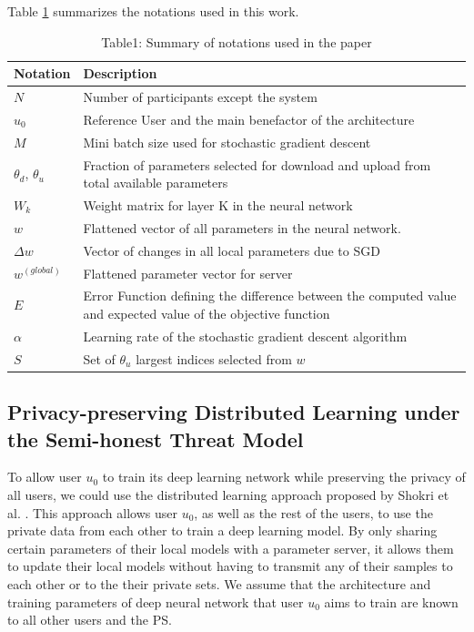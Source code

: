 \documentclass[conference]{IEEEtran}
\begin{document}
Table \ref{table:1} summarizes the notations used in this work.
\begin{table}[!h]
\centering
\caption{Table1: Summary of notations used in the paper}
\label{table:1}
\begin{tabular}{ | m{} | m{}| } 
\hline
\textbf{Notation} & \textbf{Description} \\
 \hline\hline

$N$ & Number of participants except the system\\
\hline
$u_0$ & Reference User and the  main benefactor of the architecture \\
\hline
$M$ & Mini batch size used for stochastic gradient descent\\
\hline
$\theta_d$, $\theta_u$ & Fraction of parameters selected for download and upload from total available parameters \\
\hline
$W_k$ & Weight matrix for layer K in the neural network\\
\hline
$w$ & Flattened vector of all parameters in the neural network. \\
\hline
$\Delta w$ & Vector of changes in all local parameters due to SGD\\
\hline
$w^{(global)}$ & Flattened parameter vector for server\\
\hline
$E$ & Error Function defining the difference between the computed value and expected value of the objective function \\
\hline
$\alpha$ & Learning rate of the stochastic gradient descent algorithm\\
\hline
$S$ & Set of $\theta_u$ largest indices selected from $w$ \\
\hline
\end{tabular}
\end{table}
\subsection{Privacy-preserving Distributed Learning under the Semi-honest Threat Model}
To allow user $u_0$ to train its deep learning network while preserving the privacy of all users, we could use the distributed
learning approach proposed by Shokri et al. \cite{shokri2015privacy}. This approach allows user $u_0$, as well as the rest of the users, 
to use the private data from each other to train a deep learning model. By only sharing certain parameters of their local models
with a parameter server, it allows them to update their local models without having to transmit any of their samples to each other
or to the their private sets. We assume that the architecture and training parameters of  deep neural network that user $u_0$ aims to
train are known  to all other users and the PS.
\end{document}
